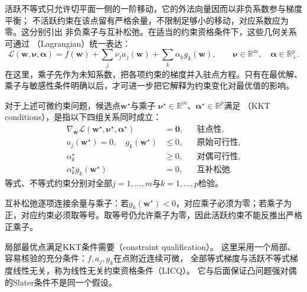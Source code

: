 活跃不等式只允许切平面一侧的一阶移动，它的外法向量因而以非负系数参与梯度平衡；
不活跃约束在该点留有严格余量，不限制足够小的移动，对应系数应为零。这分别引出
非负乘子与互补松弛。在适当的约束资格条件下，这些几何关系可通过
（Lagrangian）统一表达：
\[
  \mathcal{L}(\bm{w},\bm{\nu},\bm{\alpha})
  =f(\bm{w})+\sum_j\nu_j a_j(\bm{w})
  +\sum_k\alpha_k g_k(\bm{w}),
  \qquad
  \bm{\nu}\in\mathbb{R}^m,\quad
  \bm{\alpha}\in\mathbb{R}_+^p.
\]
在这里，乘子先作为未知系数，把各项约束的梯度并入驻点方程。只有在最优解、乘子与敏感性条件明确以后，才可进一步把它解释为约束变化对最优值的影响。

\begin{definition}[KKT条件]
\label{def:opt-kkt-conditions}
对于上述可微约束问题，候选点$\bm w^\star$与乘子
$\bm\nu^\star\in\mathbb R^m$、$\bm\alpha^\star\in\mathbb R^p$满足
（KKT conditions），是指以下四组关系同时成立：
\begin{align}
  \nabla_{\bm{w}}\mathcal{L}(\bm{w}^{\star},\bm{\nu}^{\star},
  \bm{\alpha}^{\star})&=\bm{0},
  &&\text{驻点性},\label{eq:opt-kkt-stationarity}\\
  a_j(\bm{w}^{\star})=0,\quad g_k(\bm{w}^{\star})&\leq0,
  &&\text{原始可行性},\\
  \alpha_k^{\star}&\geq0,
  &&\text{对偶可行性},\\
  \alpha_k^{\star}g_k(\bm{w}^{\star})&=0,
  &&\text{互补松弛}.\label{eq:opt-kkt-complementarity}
\end{align}
等式、不等式约束分别对全部$j=1,\ldots,m$与$k=1,\ldots,p$检验。
\end{definition}
互补松弛逐项连接余量与乘子：若$g_k(\bm w^\star)<0$，对应乘子必须为零；若乘子为正，对应约束必须取等号。取等号仍允许乘子为零，因此活跃约束不能反推出严格正乘子。

局部最优点满足KKT条件需要（constraint qualification）。
这里采用一个局部、容易核验的充分条件：$f,a_j,g_k$在点附近连续可微，
全部等式梯度与活跃不等式梯度线性无关，称为线性无关约束资格条件（LICQ）。
它与后面保证凸问题强对偶的Slater条件不是同一个假设。

